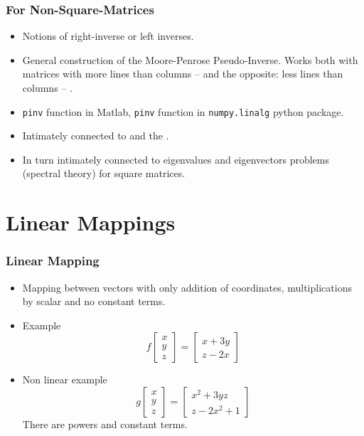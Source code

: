 \documentclass[8pt]{beamer}
\newcommand{\myemph}[1]{{\color{blue}{#1}}}
\begin{document}
\begin{frame}
  \frametitle{For Non-Square-Matrices}
  \begin{itemize}
  \item Notions of right-inverse or left inverses.
  \item General construction of the Moore-Penrose
    Pseudo-Inverse. Works both with matrices with more lines than
    columns -- \myemph{overdetermined linear systems} and the
    opposite: less lines than columns -- \myemph{underdetermined
      linear systems}.
  \item \texttt{pinv} function in Matlab, \texttt{pinv} function in \texttt{numpy.linalg} python package.
  \item Intimately connected to \myemph{linear least-squares problems} and the \myemph{Singular Value Decomposition}.
  \item In turn intimately connected to eigenvalues and eigenvectors problems (spectral theory) for square matrices.
  \end{itemize}
\end{frame}

\section{Linear Mappings}


\begin{frame}
  \frametitle{Linear Mapping}
  \begin{itemize}
  \item Mapping between vectors with only addition of coordinates, multiplications by scalar and no constant terms.
  \item Example
    $$
    f
    \begin{bmatrix}
      x\\y\\z
    \end{bmatrix}
    =
    \begin{bmatrix}
      x+3y\\z-2x
    \end{bmatrix}
    $$
  \item Non linear example
    $$g
    \begin{bmatrix}
      x\\y\\z
    \end{bmatrix}
    =
    \begin{bmatrix}
      x^2+3yz\\z-2x^2 + 1
    \end{bmatrix}
    $$
    There are powers and constant terms.
  \end{itemize}
\end{frame}
\end{document}
